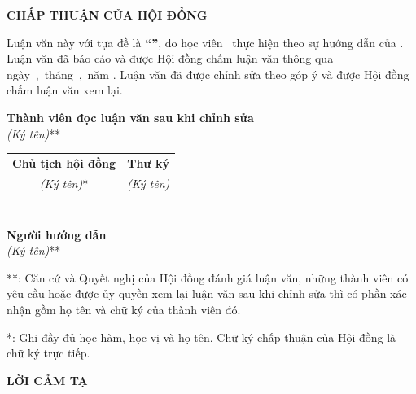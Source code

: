 
	\vspace*{50pt} %
\begin{center}
	{\fontsize{14}{0pt}\selectfont\bf CHẤP THUẬN CỦA HỘI ĐỒNG}
\end{center}
\vspace{50pt}




Luận văn này với tựa đề là {\bf``\nametitle''}, do học viên \student\, thực hiện theo sự hướng dẫn của \MainAdvisor. Luận văn đã báo cáo và được Hội đồng chấm luận văn thông qua ngày~\quad,~tháng~\quad,~năm \qquad. Luận văn đã được chỉnh sửa theo góp ý và được Hội đồng chấm luận văn xem lại.

\vspace{20pt}
\begin{center}
	\textbf{Thành viên đọc luận văn sau khi chỉnh sửa}\\
	\textit{(Ký tên)}**\\
	\vspace{80pt}
	\begin{tabular*}{.7\columnwidth}{@{\extracolsep\fill}cc@{\extracolsep\fill}} 
		\textbf{Chủ tịch hội đồng} & \textbf{Thư ký}\\
		\textit{(Ký tên)}* & \textit{(Ký tên)}\\
		\vspace{80pt} & \\
	\end{tabular*}\\
		\textbf{Người hướng dẫn}\\
	\textit{(Ký tên)}**\\
\end{center}

\vfill{\footnotesize
**: Căn cứ và Quyết nghị của Hội đồng đánh giá luận văn, những thành viên có yêu cầu hoặc được ủy quyền xem lại luận văn sau khi chỉnh sửa thì có phần xác nhận gồm họ tên và chữ ký của thành viên đó.

*: Ghi đầy đủ học hàm, học vị và họ tên. Chữ ký chấp thuận của Hội đồng là chữ ký trực tiếp.
}
\newpage
	\vspace*{50pt} %
\begin{center}
	{\fontsize{14}{0pt}\selectfont\bf LỜI CẢM TẠ}
\end{center}
\vspace{20pt}


